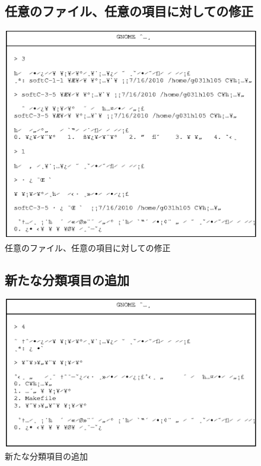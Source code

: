 \documentclass[a4j]{jarticle}
\begin{document}
\begin{figure}[h]
\subsection{任意のファイル、任意の項目に対しての修正}
\includegraphics{data_remake.eps}
\caption{任意のファイル、任意の項目に対しての修正}
\end{figure}

\begin{figure}[h]
\subsection{新たな分類項目の追加}
\includegraphics{add_category.eps}
\caption{新たな分類項目の追加}
\end{figure}
\end{document}
